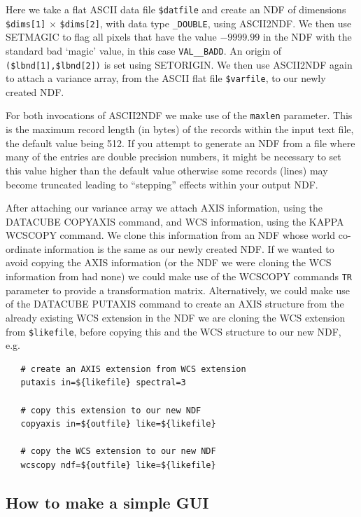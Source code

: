 \documentclass[twoside,11pt]{article}
\newcommand{\xref}[3]{#1}
\newcommand{\xlabel}[1]{}
\begin{document}
Here we take a flat ASCII data file \verb+$datfile+ and create an NDF of dimensions \verb+$dims[1]+ $\times$ \verb+$dims[2]+, with data type {\tt \_DOUBLE}, using \xref{ASCII2NDF}{sun55}{ASCII2NDF}. We then use \xref{SETMAGIC}{sun95}{SETMAGIC} to flag all pixels that have the value $-9999.99$ in the NDF with the \xref{standard bad `magic' value}{sun95}{se_masking}, in this case {\tt VAL\_\_BADD}. An origin of \verb+($lbnd[1],$lbnd[2])+ is set using \xref{SETORIGIN}{sun95}{SETORIGIN}. We then use ASCII2NDF again to attach a variance array, from the ASCII flat file \verb+$varfile+, to our newly created NDF.

For both invocations of ASCII2NDF we make use of the {\tt maxlen} parameter. This is the maximum record length (in bytes) of the records within the input text file, the default value being 512. If you attempt to generate an NDF from a file where many of the entries are double precision numbers, it might be necessary to set this value higher than the default value otherwise some records (lines) may become truncated leading to ``stepping'' effects within your output NDF.

After attaching our variance array we attach AXIS information, using the DATACUBE \xref{COPYAXIS}{sun237}{COPYAXIS} command, and WCS information, using the KAPPA \xref{WCSCOPY}{sun95}{WCSCOPY} command. We clone this information from an NDF whose world co-ordinate information is the same as our newly created NDF. If we wanted to avoid copying the AXIS information (or the NDF we were cloning the WCS information from had none) we could make use of the \xref{WCSCOPY}{sun95}{WCSCOPY} commands {\tt TR} parameter to provide a transformation matrix. Alternatively, we could make use of the DATACUBE \xref{PUTAXIS}{sun237}{PUTAXIS} command to create an AXIS structure from the already existing WCS extension in the NDF we are cloning the WCS extension from \verb+$likefile+, before copying this and the WCS structure to our new NDF, e.g.\

\small\begin{verbatim}
   # create an AXIS extension from WCS extension
   putaxis in=${likefile} spectral=3
   
   # copy this extension to our new NDF
   copyaxis in=${outfile} like=${likefile}
   
   # copy the WCS extension to our new NDF
   wcscopy ndf=${outfile} like=${likefile}
\end{verbatim}\normalsize

\subsection{\xlabel{sc16_xdialog}How to make a simple GUI\label{sc16_xdialog}}
\end{document}
